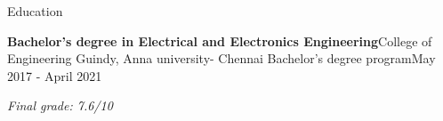 \documentclass{resume} %
\newcommand{\italicitem}[1]{\item{\textit{#1}}}
\newcommand{\plainitem}[1]{\item{#1}}
\begin{document}






\begin{rSection}{Education}

    
    \begin{rSubsectionNoBullet}{\bf Bachelor's degree in Electrical and Electronics Engineering}{College of Engineering Guindy, Anna university- Chennai }{Bachelor's degree program}{May 2017 - April 2021}
        \italicitem{Final grade: 7.6/10}
    \end{rSubsectionNoBullet}

\end{rSection}
\end{document}
